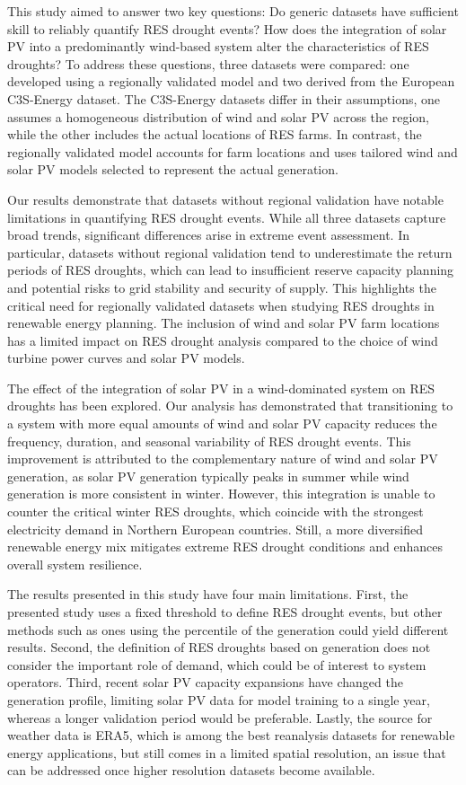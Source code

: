 \documentclass[preprint, 12pt]{elsarticle}
\begin{document}
This study aimed to answer two key questions: Do generic datasets have sufficient skill to reliably quantify RES drought events? How does the integration of solar PV into a predominantly wind-based system alter the characteristics of RES droughts? To address these questions, three datasets were compared: one developed using a regionally validated model and two derived from the European C3S-Energy dataset. The C3S-Energy datasets differ in their assumptions, one assumes a homogeneous distribution of wind and solar PV across the region, while the other includes the actual locations of RES farms. In contrast, the regionally validated model accounts for farm locations and uses tailored wind and solar PV models selected to represent the actual generation.

Our results demonstrate that datasets without regional validation have notable limitations in quantifying RES drought events. While all three datasets capture broad trends, significant differences arise in extreme event assessment. In particular, datasets without regional validation tend to underestimate the return periods of RES droughts, which can lead to insufficient reserve capacity planning and potential risks to grid stability and security of supply. This highlights the critical need for regionally validated datasets when studying RES droughts in renewable energy planning. The inclusion of wind and solar PV farm locations has a limited impact on RES drought analysis compared to the choice of wind turbine power curves and solar PV models.

The effect of the integration of solar PV in a wind-dominated system on RES droughts has been explored. Our analysis has demonstrated that transitioning to a system with more equal amounts of wind and solar PV capacity reduces the frequency, duration, and seasonal variability of RES drought events. This improvement is attributed to the complementary nature of wind and solar PV generation, as solar PV generation typically peaks in summer while wind generation is more consistent in winter. However, this integration is unable to counter the critical winter RES droughts, which coincide with the strongest electricity demand in Northern European countries. Still, a more diversified renewable energy mix mitigates extreme RES drought conditions and enhances overall system resilience.

The results presented in this study have four main limitations. First, the presented study uses a fixed threshold to define RES drought events, but other methods such as ones using the percentile of the generation could yield different results. Second, the definition of RES droughts based on generation does not consider the important role of demand, which could be of interest to system operators. Third, recent solar PV capacity expansions have changed the generation profile, limiting solar PV data for model training to a single year, whereas a longer validation period would be preferable. Lastly, the source for weather data is ERA5, which is among the best reanalysis datasets for renewable energy applications, but still comes in a limited spatial resolution, an issue that can be addressed once higher resolution datasets become available. 
\end{document}
